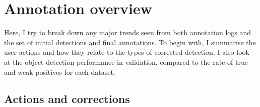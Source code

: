 \section {Annotation overview}
\label{sec:annotation_overview}

Here,  I try to break down any major trends seen from both annotation logs and the set of initial detections and final annotations. To begin with, I summarise the user actions and how they relate to the types of corrected detection. I also look at the object detection performance in validation, compared to the rate of true and weak positives for each dataset.

\subsection {Actions and corrections}

